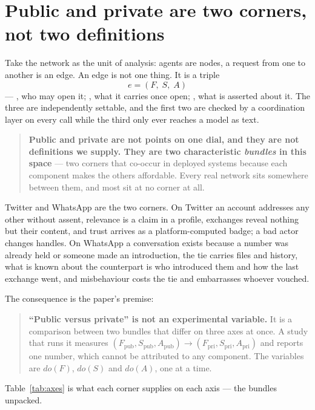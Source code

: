 \section{Public and private are two corners, not two definitions}
\label{sec:framework}

Take the network as the unit of analysis: agents are nodes, a request from one to another
is an edge. An edge is not one thing. It is a triple
%
\[
  e = (F,\; S,\; A)
\]
%
--- , who may open it; , what it carries once open;
, what is asserted about it. The three are independently settable, and
the first two are checked by a coordination layer on every call while the third only ever
reaches a model as text.

\begin{quote}
\textbf{Public and private are not points on one dial, and they are not definitions we
supply. They are two characteristic \emph{bundles} in this space} --- two corners that
co-occur in deployed systems because each component makes the others affordable. Every
real network sits somewhere between them, and most sit at no corner at all.
\end{quote}

Twitter and WhatsApp are the two corners. On Twitter an account addresses any other
without assent, relevance is a claim in a profile, exchanges reveal nothing but their
content, and trust arrives as a platform-computed badge; a bad actor changes handles. On
WhatsApp a conversation exists because a number was already held or someone made an
introduction, the tie carries files and history, what is known about the counterpart is
who introduced them and how the last exchange went, and misbehaviour costs the tie and
embarrasses whoever vouched.

The consequence is the paper's premise:

\begin{quote}
\textbf{``Public versus private'' is not an experimental variable.} It is a comparison
between two bundles that differ on three axes at once. A study that runs it measures
$(F_\text{pub}, S_\text{pub}, A_\text{pub}) \rightarrow (F_\text{pri}, S_\text{pri},
A_\text{pri})$ and reports one number, which cannot be attributed to any component. The
variables are $do(F)$, $do(S)$ and $do(A)$, one at a time.
\end{quote}

\ifcompact\else\fi

Table~\ref{tab:axes} is what each corner supplies on each axis --- the bundles unpacked.

